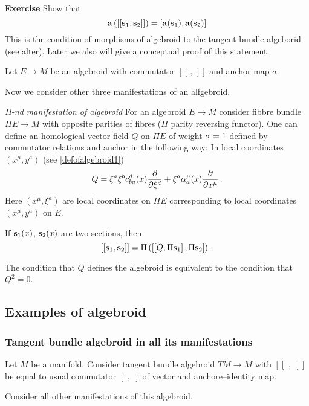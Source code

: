 \documentclass[12pt]{article}
\theoremstyle{theorem}
\numberwithin{equation}{section}
\begin{document}
{\bf Exercise}  Show that  
       \begin{equation*}\label{anchore1}
 {\bf a} \left([[{\bf s}_1,{\bf s}_2]]\right)=[{\bf a}({\bf s}_1),{\bf a}({\bf s}_2)]
            \end{equation*}
 This is the condition
of morphisms of algebroid to the tangent bundle algeborid
(see alter).  Later we also will give a conceptual proof of this statement.

\m

  Let $E\to M$ be an algebroid with commutator $[[\,,\,]]$ and anchor map $a$.

  Now we consider other three manifestations of an alfgebroid.

{\sl II-nd manifestation of algebroid}  For an algebroid $E\to M$
consider fibbre bundle $\Pi E\to M$ with opposite parities of fibres
($\Pi$ parity reversing functor).   One can define
  an homological vector field $Q$ on $\Pi E$ of weight ${\sigma}=1$
defined by commutator relations and anchor in the following way:
 In local coordinates $(x^\mu,y^a)$ (see \eqref{defofalgebroid1}) 
                \begin{equation}\label{hofieldforalgebroid1}
            Q=\xi^a\xi^b c_{ba}^d(x){\partial\over \partial \xi^d}+
            \xi^a\alpha^\mu_a(x){\partial\over \partial x^\mu}\,.
                 \end{equation}
Here $(x^\mu,\xi^a)$ are local coordinates on $\Pi E$ corresponding to 
local coordinates $(x^\mu,y^a)$ on $ E$.

  If ${\bf s}_1(x)$, ${\bf s}_2(x)$ are two sections, then
              $$
[[{\bf s}_1,{\bf s}_2]]=\Pi\left(\left[\left[Q,\Pi {\bf s}_1\right],\Pi {\bf s}_2
         \right]\right)\,.
              $$


  The condition that $Q$ defines the algebroid is equivalent to the condition
that $Q^2=0$.
 

\subsection{Examples of algebroid}

  \subsubsection{Tangent bundle algebroid in all its manifestations}

Let $M$ be a manifold. Consider tangent bundle algebroid
 $TM\to M$ with $[[\,\,,\,\,]]$ be equal to usual commutator 
$[\,\,,\,\,]$ of vector and anchore--identity map.

Consider all other manifestations of this algebroid.
\end{document}
